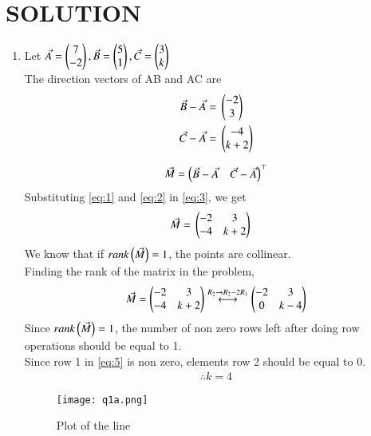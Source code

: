 \documentclass[journal,12pt,twocolumn]{IEEEtran}
\begin{document}
\section*{SOLUTION}
\begin{enumerate}
\item Let $\Vec{A}=\begin{pmatrix}7\\-2\end{pmatrix}, \Vec{B}=\begin{pmatrix}5 \\ 1\end{pmatrix}, \Vec{C}=\begin{pmatrix}3 \\ k\end{pmatrix}$\\
The direction vectors of AB and AC are
\begin{align}
\label{eq:1}
\Vec{B} - \Vec{A} ={}& \begin{pmatrix}-2 \\ 3\end{pmatrix}\\
\label{eq:2}
\Vec{C} - \Vec{A} ={}& \begin{pmatrix}-4 \\ k+2\end{pmatrix}
\end{align}

\begin{align}
\label{eq:3}
\Vec{M} =\begin{pmatrix}\Vec{B}-\Vec{A} & \Vec{C}-\Vec{A}\end{pmatrix}^\top
\end{align}
Substituting \eqref{eq:1} and \eqref{eq:2} in \eqref{eq:3}, we get
\begin{align}
\label{eq:4}
\Vec{M}={}&\begin{pmatrix}-2 & 3 \\ -4 & k+2\end{pmatrix}
\end{align}
We know that if $rank\left(\Vec{M}\right)=1$, the points are collinear.\\
Finding the rank of the matrix in the problem,
\begin{align}
\label{eq:5}
\Vec{M} = \begin{pmatrix}-2 & 3 \\ -4 & k+2\end{pmatrix} \overset{R_{2}\rightarrow R_{2}-2R_{1}}{\longleftrightarrow} \begin{pmatrix}-2 & 3 \\ 0 & k-4\end{pmatrix}
\end{align}
Since $rank\left(\Vec{M}\right)=1$, the number of non zero rows left after doing row operations should be equal to 1.\\
Since row 1 in \eqref{eq:5} is non zero, elements row 2 should be equal to 0.
\begin{align}
\therefore k=4
\end{align}
\begin{figure}[!h]
\centering
\texttt{[image: q1a.png]}
\caption{Plot of the line}
\end{figure}




\end{enumerate}
\end{document}
